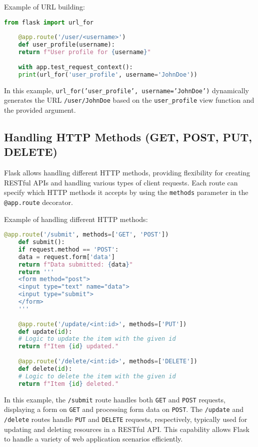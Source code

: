 Example of URL building:
\begin{lstlisting}[language=Python]
	from flask import url_for
	
	@app.route('/user/<username>')
	def user_profile(username):
	return f"User profile for {username}"
	
	with app.test_request_context():
	print(url_for('user_profile', username='JohnDoe'))
\end{lstlisting}

In this example, \texttt{url\_for('user\_profile', username='JohnDoe')} dynamically generates the URL \texttt{/user/JohnDoe} based on the \texttt{user\_profile} view function and the provided argument.

\subsection{Handling HTTP Methods (GET, POST, PUT, DELETE)}
Flask allows handling different HTTP methods, providing flexibility for creating RESTful APIs and handling various types of client requests. Each route can specify which HTTP methods it accepts by using the \texttt{methods} parameter in the \texttt{@app.route} decorator.

Example of handling different HTTP methods:
\begin{lstlisting}[language=Python]
	@app.route('/submit', methods=['GET', 'POST'])
	def submit():
	if request.method == 'POST':
	data = request.form['data']
	return f"Data submitted: {data}"
	return '''
	<form method="post">
	<input type="text" name="data">
	<input type="submit">
	</form>
	'''
	
	@app.route('/update/<int:id>', methods=['PUT'])
	def update(id):
	# Logic to update the item with the given id
	return f"Item {id} updated."
	
	@app.route('/delete/<int:id>', methods=['DELETE'])
	def delete(id):
	# Logic to delete the item with the given id
	return f"Item {id} deleted."
\end{lstlisting}

In this example, the \texttt{/submit} route handles both \texttt{GET} and \texttt{POST} requests, displaying a form on \texttt{GET} and processing form data on \texttt{POST}. The \texttt{/update} and \texttt{/delete} routes handle \texttt{PUT} and \texttt{DELETE} requests, respectively, typically used for updating and deleting resources in a RESTful API. This capability allows Flask to handle a variety of web application scenarios efficiently.\cite{Flaskdocs:2024}


